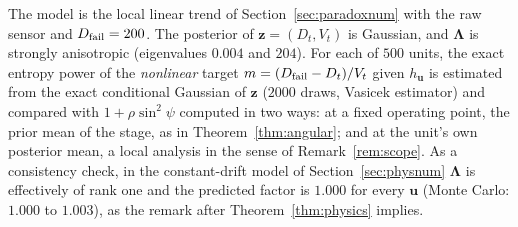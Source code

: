 \documentclass[preprint,12pt]{elsarticle}
\theoremstyle{definition}
\begin{document}
The model is the local linear trend of Section~\ref{sec:paradoxnum} with the raw sensor and $D_{\rm fail}=200$. The posterior of $\mathbf z=(D_t,V_t)$ is Gaussian, and $\boldsymbol\Lambda$ is strongly anisotropic (eigenvalues $0.004$ and $204$). For each of $500$ units, the exact entropy power of the \emph{nonlinear} target $m=(D_{\rm fail}-D_t)/V_t$ given $h_{\mathbf u}$ is estimated from the exact conditional Gaussian of $\mathbf z$ ($2000$ draws, Vasicek estimator) and compared with $1+\rho\sin^2\psi$ computed in two ways: at a fixed operating point, the prior mean of the stage, as in Theorem~\ref{thm:angular}; and at the unit's own posterior mean, a local analysis in the sense of Remark~\ref{rem:scope}. As a consistency check, in the constant-drift model of Section~\ref{sec:physnum} $\boldsymbol\Lambda$ is effectively of rank one and the predicted factor is $1.000$ for every $\mathbf u$ (Monte Carlo: $1.000$ to $1.003$), as the remark after Theorem~\ref{thm:physics} implies.


\end{document}

